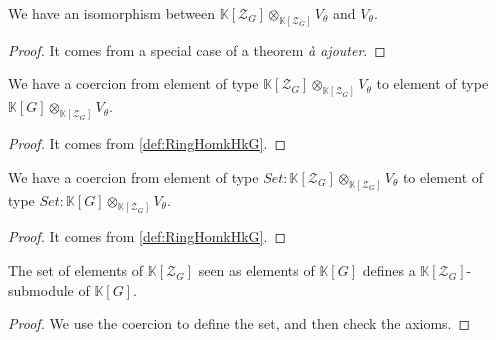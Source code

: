 \begin{proposition}
    \label{prop:module_sub_rep_iso}
    \leanok
    We have an isomorphism between $\mathbb{K}[\mathcal{Z}_G]\otimes_{\mathbb{K}[\mathcal{Z}_G]}V_\theta$ and $V_\theta$.
\end{proposition}
\begin{proof}
    It comes from a special case of a theorem \textit{à ajouter}.
\end{proof}

\begin{proposition}[Coercion]
    \label{prop:induced_rep_coe}
    \leanok 
   We have a coercion from element of type $\mathbb{K}[\mathcal{Z}_G]\otimes_{\mathbb{K}[\mathcal{Z}_G]}V_\theta$
   to element of type $\mathbb{K}[G]\otimes_{\mathbb{K}[\mathcal{Z}_G]}V_\theta$.
\end{proposition}
\begin{proof}
    \leanok
    It comes from \ref{def:RingHomkHkG}.
\end{proof}

\begin{proposition}
    \label{prop:induced_rep_coe_set}
    \leanok 
   We have a coercion from element of type $Set : \mathbb{K}[\mathcal{Z}_G]\otimes_{\mathbb{K}[\mathcal{Z}_G]}V_\theta$
   to element of type $Set : \mathbb{K}[G]\otimes_{\mathbb{K}[\mathcal{Z}_G]}V_\theta$.
\end{proposition}
\begin{proof}
    \leanok
    It comes from \ref{def:RingHomkHkG}.
\end{proof}

\begin{proposition}
    \label{prop:center_submodule}
    \leanok 
    The set of elements of $\mathbb{K}[\mathcal{Z}_G]$ seen as elements of $\mathbb{K}[G]$
    defines a $\mathbb{K}[\mathcal{Z}_G]$-submodule of $\mathbb{K}[G]$.
\end{proposition}
\begin{proof}
    \leanok
    We use the coercion to define the set, and then check the axioms.
\end{proof}

